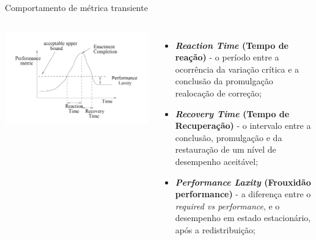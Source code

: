 \begin{frame}{Comportamento de métrica transiente}
	\begin{columns}
		\begin{minipage}[c][0.4\textheight][c]{\linewidth}
			\centering
			\includegraphics[width=1.5\linewidth]{../monograph/images/transient-metric.png}
			\label{fig:transient-metric}	
		\end{minipage}
		\begin{minipage}[c][0.4\textheight][c]{\linewidth}
			\begin{itemize}
				\item \textbf{\textit{Reaction Time} (Tempo de reação)} - o período entre a ocorrência da variação crítica e a conclusão da promulgação realocação de correção;
				
				\item \textbf{\textit{Recovery Time} (Tempo de Recuperação)} - o intervalo entre a conclusão, promulgação e da restauração de um nível de desempenho aceitável;
				
				\item \textbf{\textit{Performance Laxity} (Frouxidão performance)} - a diferença entre o \textit{required vs performance}, e o desempenho em estado estacionário, após a redistribuição;
			\end{itemize}
		\end{minipage}		
	\end{columns}
\end{frame}

